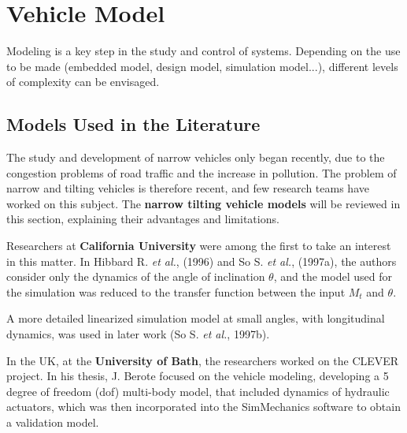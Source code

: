 \newpage

\section{Vehicle Model}
Modeling is a key step in the study and control of systems. Depending on the use to be made (embedded model, design model, simulation model...), different levels of complexity can be envisaged.

\subsection{Models Used in the Literature}
The study and development of narrow vehicles only began recently, due to the congestion problems of road traffic and the increase in pollution. The problem of narrow and tilting vehicles is therefore recent, and few research teams have worked on this subject. The \textbf{narrow tilting vehicle models} will be reviewed in this section, explaining their advantages and limitations. 

Researchers at \textbf{California University} were among the first to take an interest in this matter. In Hibbard R. \textit{et al.}, (1996)\cite[-4.5cm]{hibbard1996twenty} and So S. \textit{et al.}, (1997a)\cite[-1.7cm]{doi:10.1080/00423119708969321}, the authors consider only the dynamics of the angle of inclination $\theta$, and the model used for the simulation was reduced to the transfer function between the input $M_t$ and $\theta$. 

A more detailed linearized simulation model at small angles, with longitudinal dynamics, was used in later work (So S. \textit{et al.}, 1997b)\cite[-1.7cm]{doi:10.1504/IJVD.1997.062071}.

In the UK, at the \textbf{University of Bath}, the researchers worked on the CLEVER project. In his thesis\cite[-0.3cm]{bath24682}, J. Berote focused on the vehicle modeling, developing a 5 degree of freedom (dof) multi-body model, that included dynamics of hydraulic actuators, which was then incorporated into the SimMechanics software to obtain a validation model. 

